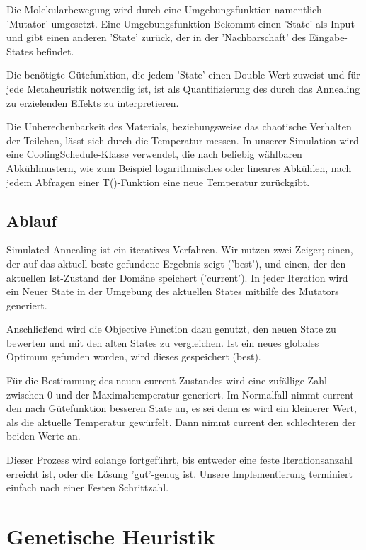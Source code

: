 \documentclass[runningheads,a4paper]{llncs}
\begin{document}
Die Molekularbewegung wird durch eine Umgebungsfunktion namentlich 'Mutator' umgesetzt. Eine Umgebungsfunktion Bekommt einen 'State' als Input und gibt einen anderen 'State' zurück, der in der 'Nachbarschaft' des Eingabe-States befindet.

Die benötigte Gütefunktion, die jedem 'State' einen Double-Wert zuweist und für jede Metaheuristik notwendig ist, ist als Quantifizierung des durch das Annealing zu erzielenden Effekts zu interpretieren.

Die Unberechenbarkeit des Materials, beziehungsweise das chaotische Verhalten der Teilchen, lässt sich durch die Temperatur messen. In unserer Simulation wird eine CoolingSchedule-Klasse verwendet, die nach beliebig wählbaren Abkühlmustern, wie zum Beispiel logarithmisches oder lineares Abkühlen, nach jedem Abfragen einer T()-Funktion eine neue Temperatur zurückgibt.

\subsection{Ablauf}

Simulated Annealing ist ein iteratives Verfahren. Wir nutzen zwei Zeiger; einen, der auf das aktuell beste gefundene Ergebnis zeigt ('best'), und einen, der den aktuellen Ist-Zustand der Domäne speichert ('current'). In jeder Iteration wird ein Neuer State in der Umgebung des aktuellen States mithilfe des Mutators generiert.

Anschließend wird die Objective Function dazu genutzt, den neuen State zu bewerten und mit den alten States zu vergleichen. Ist ein neues globales Optimum gefunden worden, wird dieses gespeichert (best).

Für die Bestimmung des neuen current-Zustandes wird eine zufällige Zahl zwischen 0 und der Maximaltemperatur generiert. Im Normalfall nimmt current den nach Gütefunktion besseren State an, es sei denn es wird ein kleinerer Wert, als die aktuelle Temperatur gewürfelt. Dann nimmt current den schlechteren der beiden Werte an.

Dieser Prozess wird solange fortgeführt, bis entweder eine feste Iterationsanzahl erreicht ist, oder die Lösung 'gut'-genug ist. Unsere Implementierung terminiert einfach nach einer Festen Schrittzahl.

\section{Genetische Heuristik}
\end{document}

